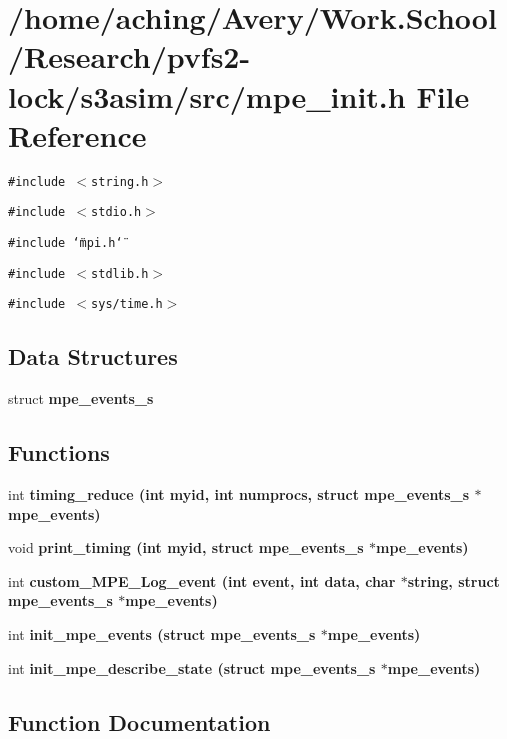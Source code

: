 \section{/home/aching/Avery/Work.School/Research/pvfs2-lock/s3asim/src/mpe\_\-init.h File Reference}
\label{mpe__init_8h}
{\tt \#include $<$string.h$>$}\par
{\tt \#include $<$stdio.h$>$}\par
{\tt \#include \char`\"{}mpi.h\char`\"{}}\par
{\tt \#include $<$stdlib.h$>$}\par
{\tt \#include $<$sys/time.h$>$}\par
\subsection*{Data Structures}
\begin{CompactItemize}
\item 
struct \bf{mpe\_\-events\_\-s}
\end{CompactItemize}
\subsection*{Functions}
\begin{CompactItemize}
\item 
int \bf{timing\_\-reduce} (int myid, int numprocs, struct \bf{mpe\_\-events\_\-s} $\ast$mpe\_\-events)
\item 
void \bf{print\_\-timing} (int myid, struct \bf{mpe\_\-events\_\-s} $\ast$mpe\_\-events)
\item 
int \bf{custom\_\-MPE\_\-Log\_\-event} (int event, int data, char $\ast$string, struct \bf{mpe\_\-events\_\-s} $\ast$mpe\_\-events)
\item 
int \bf{init\_\-mpe\_\-events} (struct \bf{mpe\_\-events\_\-s} $\ast$mpe\_\-events)
\item 
int \bf{init\_\-mpe\_\-describe\_\-state} (struct \bf{mpe\_\-events\_\-s} $\ast$mpe\_\-events)
\end{CompactItemize}


\subsection{Function Documentation}
